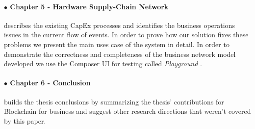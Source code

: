 \paragraph{$\bullet$ Chapter 5 - Hardware Supply-Chain Network} describes the existing CapEx processes and identifies the business operations issues in the current flow of events. In order to prove how our solution fixes these problems we present the main uses case of the system in detail. In order to demonstrate the correctness and completeness of the business network model developed we use the Composer UI for testing called \emph{Playground} \cite{composer-playground}. 

\paragraph{$\bullet$ Chapter 6 - Conclusion} builds the thesis conclusions by summarizing the thesis' contributions for Blockchain for business and suggest other research directions that weren't covered by this paper.















